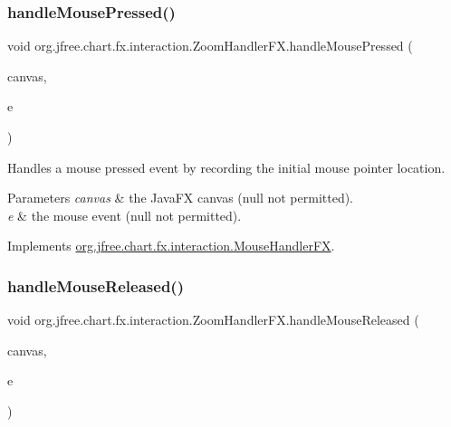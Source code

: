 \subsubsection{\texorpdfstring{handle\+Mouse\+Pressed()}{handleMousePressed()}}
{\footnotesize\ttfamily void org.\+jfree.\+chart.\+fx.\+interaction.\+Zoom\+Handler\+F\+X.\+handle\+Mouse\+Pressed (\begin{DoxyParamCaption}\item[{\mbox{\hyperlink{classorg_1_1jfree_1_1chart_1_1fx_1_1_chart_canvas}{Chart\+Canvas}}}]{canvas,  }\item[{Mouse\+Event}]{e }\end{DoxyParamCaption})}

Handles a mouse pressed event by recording the initial mouse pointer location.


\begin{DoxyParams}{Parameters}
{\em canvas} & the Java\+FX canvas ({\ttfamily null} not permitted). \\
\hline
{\em e} & the mouse event ({\ttfamily null} not permitted). \\
\hline
\end{DoxyParams}


Implements \mbox{\hyperlink{interfaceorg_1_1jfree_1_1chart_1_1fx_1_1interaction_1_1_mouse_handler_f_x_a0cf92e5a448b58c199fc12dbdbd39aab}{org.\+jfree.\+chart.\+fx.\+interaction.\+Mouse\+Handler\+FX}}.

\mbox{\label{classorg_1_1jfree_1_1chart_1_1fx_1_1interaction_1_1_zoom_handler_f_x_af47ee1c3f51772d2bbd503c5d6c3ba71}} 
\subsubsection{\texorpdfstring{handle\+Mouse\+Released()}{handleMouseReleased()}}
{\footnotesize\ttfamily void org.\+jfree.\+chart.\+fx.\+interaction.\+Zoom\+Handler\+F\+X.\+handle\+Mouse\+Released (\begin{DoxyParamCaption}\item[{\mbox{\hyperlink{classorg_1_1jfree_1_1chart_1_1fx_1_1_chart_canvas}{Chart\+Canvas}}}]{canvas,  }\item[{Mouse\+Event}]{e }\end{DoxyParamCaption})}

